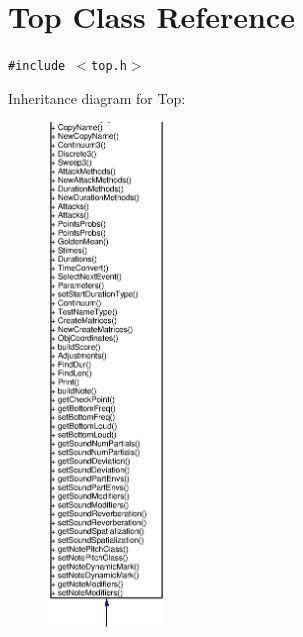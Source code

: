 \section{Top Class Reference}
\label{classTop}
{\tt \#include $<$top.h$>$}

Inheritance diagram for Top:\begin{figure}[H]
\begin{center}
\leavevmode
\includegraphics[width=88pt]{classTop__inherit__graph}
\end{center}
\end{figure}

